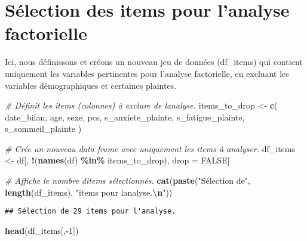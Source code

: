 \documentclass[
]{article}
\newenvironment{Shaded}{\begin{snugshade}}{\end{snugshade}}
\newcommand{\CommentTok}[1]{\textcolor[rgb]{0.56,0.35,0.01}{\textit{#1}}}
\newcommand{\ConstantTok}[1]{\textcolor[rgb]{0.56,0.35,0.01}{#1}}
\newcommand{\DecValTok}[1]{\textcolor[rgb]{0.00,0.00,0.81}{#1}}
\newcommand{\FunctionTok}[1]{\textcolor[rgb]{0.13,0.29,0.53}{\textbf{#1}}}
\newcommand{\NormalTok}[1]{#1}
\newcommand{\OtherTok}[1]{\textcolor[rgb]{0.56,0.35,0.01}{#1}}
\newcommand{\SpecialCharTok}[1]{\textcolor[rgb]{0.81,0.36,0.00}{\textbf{#1}}}
\newcommand{\StringTok}[1]{\textcolor[rgb]{0.31,0.60,0.02}{#1}}
\begin{document}
\section{Sélection des items pour l'analyse
factorielle}\label{suxe9lection-des-items-pour-lanalyse-factorielle}

Ici, nous définissons et créons un nouveau jeu de données (df\_items)
qui contient uniquement les variables pertinentes pour l'analyse
factorielle, en excluant les variables démographiques et certaines
plaintes.

\begin{Shaded}
\begin{Highlighting}[]
\CommentTok{\# Définit les items (colonnes) à exclure de l\textquotesingle{}analyse.}
\NormalTok{items\_to\_drop }\OtherTok{\textless{}{-}} \FunctionTok{c}\NormalTok{(}
  \StringTok{\textquotesingle{}date\_bilan\textquotesingle{}}\NormalTok{,}
  \StringTok{\textquotesingle{}age\textquotesingle{}}\NormalTok{,}
  \StringTok{\textquotesingle{}sexe\textquotesingle{}}\NormalTok{,}
  \StringTok{\textquotesingle{}pcs\textquotesingle{}}\NormalTok{,}
  \StringTok{\textquotesingle{}s\_anxiete\_plainte\textquotesingle{}}\NormalTok{,}
  \StringTok{\textquotesingle{}s\_fatigue\_plainte\textquotesingle{}}\NormalTok{,}
  \StringTok{\textquotesingle{}s\_sommeil\_plainte\textquotesingle{}}
\NormalTok{)}

\CommentTok{\# Crée un nouveau data frame avec uniquement les items à analyser.}
\NormalTok{df\_items }\OtherTok{\textless{}{-}}\NormalTok{ df[, }\SpecialCharTok{!}\NormalTok{(}\FunctionTok{names}\NormalTok{(df) }\SpecialCharTok{\%in\%}\NormalTok{ items\_to\_drop), drop }\OtherTok{=} \ConstantTok{FALSE}\NormalTok{]}

\CommentTok{\# Affiche le nombre d\textquotesingle{}items sélectionnés.}
\FunctionTok{cat}\NormalTok{(}\FunctionTok{paste}\NormalTok{(}\StringTok{"Sélection de"}\NormalTok{, }\FunctionTok{length}\NormalTok{(df\_items), }\StringTok{"items pour l\textquotesingle{}analyse.}\SpecialCharTok{\textbackslash{}n}\StringTok{"}\NormalTok{))}
\end{Highlighting}
\end{Shaded}

\begin{verbatim}
## Sélection de 29 items pour l'analyse.
\end{verbatim}

\begin{Shaded}
\begin{Highlighting}[]
\FunctionTok{head}\NormalTok{(df\_items[,}\SpecialCharTok{{-}}\DecValTok{1}\NormalTok{])}
\end{Highlighting}
\end{Shaded}
\end{document}
